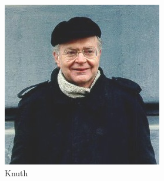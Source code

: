 \begin{figure}
    \centering
    \includegraphics[width=0.4\linewidth]{images/knuth}
    \caption{Knuth}
    \label{fig:my_label}
\end{figure}